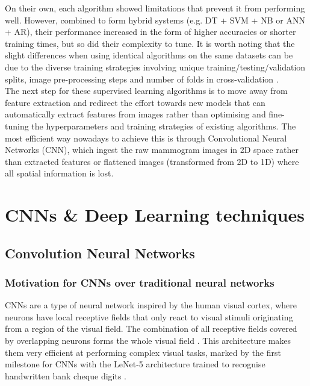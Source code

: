 On their own, each algorithm showed limitations that prevent it from performing well. However, combined to form hybrid systems (e.g. DT + SVM + NB or ANN + AR), their performance increased in the form of higher accuracies or shorter training times, but so did their complexity to tune. It is worth noting that the slight differences when using identical algorithms on the same datasets can be due to the diverse training strategies involving unique training/testing/validation splits, image pre-processing steps and number of folds in cross-validation \citep{Yue2018}.\\

The next step for these supervised learning algorithms is to move away from feature extraction and redirect the effort towards new models that can automatically extract features from images rather than optimising and fine-tuning the hyperparameters and training strategies of existing algorithms. The most efficient way nowadays to achieve this is through Convolutional Neural Networks (CNN), which ingest the raw mammogram images in 2D space rather than extracted features or flattened images (transformed from 2D to 1D) where all spatial information is lost.


\section{CNNs \& Deep Learning techniques}
\label{sec:litsurvey-DLtechniques-CNN}

\subsection{Convolution Neural Networks}

\subsubsection{Motivation for CNNs over traditional neural networks}

CNNs are a type of neural network inspired by the human visual cortex, where neurons have local receptive fields that only react to visual stimuli originating from a region of the visual field. The combination of all receptive fields covered by overlapping neurons forms the whole visual field \citep{Geron2019}. This architecture makes them very efficient at performing complex visual tasks, marked by the first milestone for CNNs with the LeNet-5 architecture trained to recognise handwritten bank cheque digits \citep{LeCun1998}.\\

